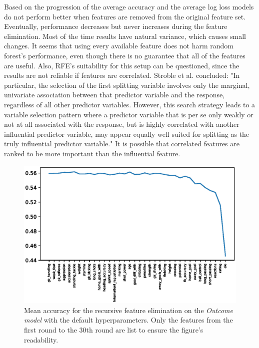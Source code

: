 Based on the progression of the average accuracy and the average log loss models do not perform better when features are removed from the original feature set. Eventually, performance decreases but never increases during the feature elimination. Most of the time results have natural variance, which causes small changes. It seems that using every available feature does not harm random forest's performance, even though there is no guarantee that all of the features are useful. Also, RFE's suitability for this setup can be questioned, since the results are not reliable if features are correlated. Stroble et al. concluded: "In particular, the selection of the first splitting variable involves only the marginal, univariate association between that predictor variable and the response, regardless of all other predictor variables. However, this search strategy leads to a variable selection pattern where a predictor variable that is per se only weakly or not at all associated with the response, but is highly correlated with another influential predictor variable, may appear equally well suited for splitting as the truly influential predictor variable." It is possible that correlated features are ranked to be more important than the influential feature.
\begin{figure}[H]
    \centering
    \includegraphics[width=1\textwidth]{img/default_avg_accuracy.eps}
    \caption{Mean accuracy for the recursive feature elimination on the \textit{Outcome model} with the default hyperparameters. Only the features from the first round to the 30th round are list to ensure the figure's readability.}
    \label{fig:def_avg_accu}
\end{figure}

